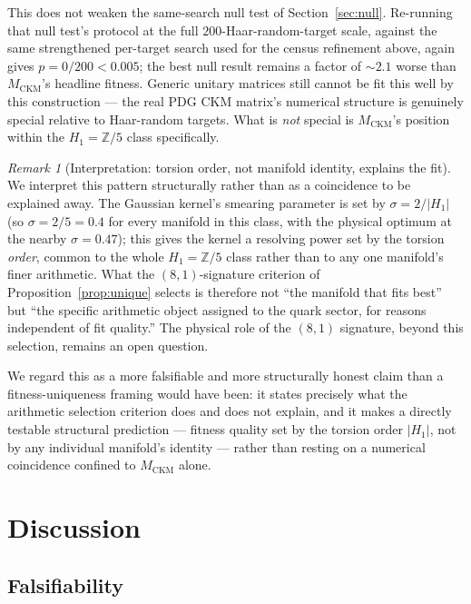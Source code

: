 \documentclass[11pt,a4paper]{article}
\theoremstyle{remark}
\newtheorem{remark}[theorem]{Remark}
\newcommand{\MCKM}{M_{\mathrm{CKM}}}
\newcommand{\Zfive}{\mathbb{Z}/5}
\begin{document}
This does not weaken the same-search null test of Section~\ref{sec:null}.
Re-running that null test's protocol at the full $200$-Haar-random-target
scale, against the same strengthened per-target search used for the census
refinement above, again gives $p = 0/200 < 0.005$; the best null result
remains a factor of $\sim 2.1$ worse than $\MCKM$'s headline fitness.
Generic unitary matrices still cannot be fit this well by this
construction --- the real PDG CKM matrix's numerical structure is
genuinely special relative to Haar-random targets. What is \emph{not}
special is $\MCKM$'s position within the $H_1 = \Zfive$ class specifically.

\begin{remark}[Interpretation: torsion order, not manifold identity, explains the fit]
\label{rem:torsion_generic}
We interpret this pattern structurally rather than as a coincidence to
be explained away. The Gaussian kernel's smearing parameter is set by
$\sigma = 2/|H_1|$ (so $\sigma = 2/5 = 0.4$ for every manifold in this
class, with the physical optimum at the nearby $\sigma = 0.47$); this
gives the kernel a resolving power set by the torsion \emph{order},
common to the whole $H_1 = \Zfive$ class rather than to any one
manifold's finer arithmetic. What the $(8,1)$-signature criterion of
Proposition~\ref{prop:unique} selects is therefore not ``the manifold
that fits best'' but ``the specific arithmetic object assigned to the
quark sector, for reasons independent of fit quality.'' The physical
role of the $(8,1)$ signature, beyond this selection, remains an open
question.
\end{remark}

We regard this as a more falsifiable and more structurally honest claim
than a fitness-uniqueness framing would have been: it states precisely
what the arithmetic selection criterion does and does not explain, and it
makes a directly testable structural prediction --- fitness quality set
by the torsion order $|H_1|$, not by any individual manifold's identity
--- rather than resting on a numerical coincidence confined to $\MCKM$
alone.

\section{Discussion}
\label{sec:discuss}

\subsection{Falsifiability}
\end{document}
